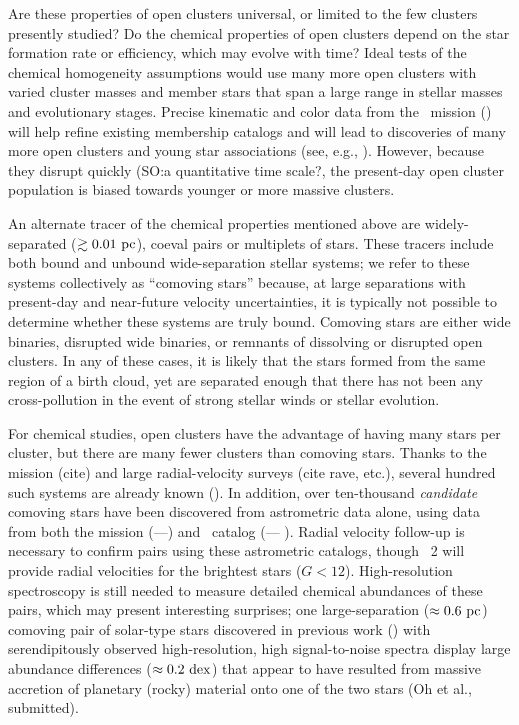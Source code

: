 \documentclass[modern, letterpaper]{aastex61}
\newcommand{\gaia}{\project{Gaia}}
\newcommand{\DR}[1]{\acronym{DR}#1}
\newcommand{\tgas}{\acronym{TGAS}}
\newcommand{\dex}{\ensuremath{{\rm dex}}}
\newcommand{\smoh}[1]{\textcolor{mediumpersianblue}{SO:#1}}
\begin{document}
Are these properties of open clusters universal, or limited to the few clusters
presently studied?
Do the chemical properties of open clusters depend on the star formation rate or
efficiency, which may evolve with time?
Ideal tests of the chemical homogeneity assumptions would use many more open
clusters with varied cluster masses and member stars that span a large range in
stellar masses and evolutionary stages.
Precise kinematic and color data from the \gaia\ mission
(\citealt{Gaia-Collaboration:2016,Gaia-Collaboration:2016a}) will help refine
existing membership catalogs and will lead to discoveries of many more open
clusters and young star associations (see, e.g., \citealt{Oh:2017}).
However, because they disrupt quickly (\smoh{a quantitative time scale?},
the present-day open cluster population
is biased towards younger or more massive clusters.

An alternate tracer of the chemical properties mentioned above are
widely-separated ($\gtrsim 0.01~\mathrm{pc}$), coeval pairs or multiplets of stars.
These tracers include both bound and unbound wide-separation stellar systems; we
refer to these systems collectively as ``comoving stars'' because, at large
separations with present-day and near-future velocity uncertainties, it is
typically not possible to determine whether these systems are truly bound.
Comoving stars are either wide binaries, disrupted wide binaries, or remnants of
dissolving or disrupted open clusters.
In any of these cases, it is likely that the stars formed from the same region
of a birth cloud, yet are separated enough that there has not been any
cross-pollution in the event of strong stellar winds or stellar evolution.

For chemical studies, open clusters have the advantage of having many stars per
cluster, but there are many fewer clusters than comoving stars.
Thanks to the  mission (cite) and large radial-velocity
surveys (cite rave, etc.), several hundred such systems are already known
(\citealt{Shaya:2011}).
In addition, over ten-thousand \emph{candidate} comoving stars have been
discovered from astrometric data alone, using data from both the
 mission (\citealt{ESA:1997}---\citealt{Shaya:2011}) and
\tgas\ catalog (\citealt{Gaia-Collaboration:2016a}---
\citealt{Oh:2017,Oelkers:2017,Andrews:2017}).
Radial velocity follow-up is necessary to confirm pairs using these astrometric
catalogs, though \gaia\ \DR{2} will provide radial velocities for the brightest
stars ($G < 12$).
High-resolution spectroscopy is still needed to measure detailed chemical
abundances of these pairs, which may present interesting surprises; one
large-separation ($\approx 0.6~\mathrm{pc}$) comoving pair of solar-type stars
discovered in previous work (\citealt{Oh:2017}) with serendipitously observed
high-resolution, high signal-to-noise spectra display large abundance
differences ($\approx 0.2~\dex$) that appear to have resulted from massive
accretion of planetary (rocky) material onto one of the two stars (Oh et al.,
submitted).
\end{document}
